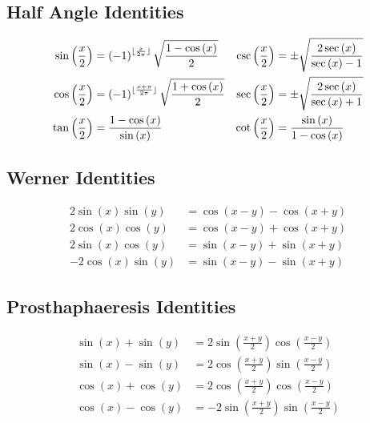 \documentclass{article}
\begin{document}
\subsection{Half Angle Identities}
\begin{align*}
	\sin{\left( \frac{x}{2} \right)} &= \left( -1 \right)^{\lfloor\frac{x}{2\pi}\rfloor}\sqrt{\frac{1-\cos{\left( x \right)}}{2}}     & \csc{\left( \frac{x}{2} \right)} &= \pm \sqrt{\frac{2\sec{\left( x \right)}}{\sec{\left( x \right)}-1}} \\
	\cos{\left( \frac{x}{2} \right)} &= \left( -1 \right)^{\lfloor\frac{x+\pi}{2\pi}\rfloor}\sqrt{\frac{1+\cos{\left( x \right)}}{2}} & \sec{\left( \frac{x}{2} \right)} &= \pm \sqrt{\frac{2\sec{\left( x \right)}}{\sec{\left( x \right)}+1}} \\
	\tan{\left( \frac{x}{2} \right)} &= \frac{1-\cos{\left( x \right)}}{\sin{\left( x \right)}}                                 & \cot{\left( \frac{x}{2} \right)} &= \frac{\sin{\left( x \right)}}{1-\cos{\left( x \right)}} 
\end{align*}
\subsection{Werner Identities}
\begin{align*}
	 2\sin{\left( x \right)}\sin{\left( y \right)} &= \cos{\left( x-y \right)}-\cos{\left( x+y \right)} \\
	 2\cos{\left( x \right)}\cos{\left( y \right)} &= \cos{\left( x-y \right)}+\cos{\left( x+y \right)} \\
	 2\sin{\left( x \right)}\cos{\left( y \right)} &= \sin{\left( x-y \right)}+\sin{\left( x+y \right)} \\
    -2\cos{\left( x \right)}\sin{\left( y \right)} &= \sin{\left( x-y \right)}-\sin{\left( x+y \right)}
\end{align*}
\subsection{Prosthaphaeresis Identities}
\begin{align*}
	\sin{\left( x \right)}+\sin{\left( y \right)} &= 2\sin{\left(\frac{x+y}{2} \right)}\cos{\left( \frac{x-y}{2} \right)} \\
	\sin{\left( x \right)}-\sin{\left( y \right)} &= 2\cos{\left(\frac{x+y}{2} \right)}\sin{\left( \frac{x-y}{2} \right)} \\
	\cos{\left( x \right)}+\cos{\left( y \right)} &= 2\cos{\left(\frac{x+y}{2} \right)}\cos{\left( \frac{x-y}{2} \right)} \\
	\cos{\left( x \right)}-\cos{\left( y \right)} &= -2\sin{\left(\frac{x+y}{2} \right)}\sin{\left( \frac{x-y}{2} \right)} \\
\end{align*}
\end{document}
